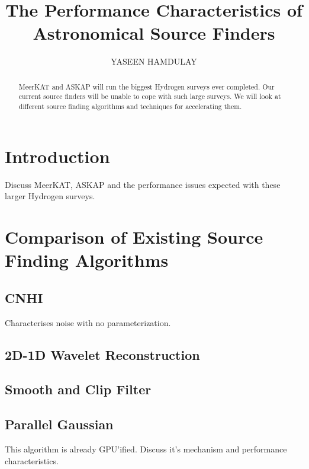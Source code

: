 \documentclass[prodmode,acmtecs]{acmsmall}
\begin{document}
\title{The Performance Characteristics of Astronomical Source Finders}
\author{YASEEN HAMDULAY
}

\begin{abstract}
MeerKAT and ASKAP will run the biggest Hydrogen surveys ever completed. Our current source
finders will be unable to cope with such large surveys. We will look at different source
finding algorithms and techniques for accelerating them.
\end{abstract}


\maketitle

\section{Introduction}
Discuss MeerKAT, ASKAP and the performance issues expected with these larger Hydrogen surveys.
\cite{holwerda2010trumpeting}
\cite{whiting2012source}
\cite{floer2014source}

\section{Comparison of Existing Source Finding Algorithms}
 \cite{westerlund2012assessing}
 \cite{popping2012comparison}

    \subsection{CNHI}
Characterises noise with no parameterization.
    \cite{jurek2012characterised}

    \subsection{2D-1D Wavelet Reconstruction}
    \cite{floer20122d}

    \subsection{Smooth and Clip Filter}
\cite{serra2012atlas3d}

    \subsection{Parallel Gaussian}
This algorithm is already GPU'ified. Discuss it's mechanism and performance characteristics.
        \cite{westerlund2014framework}
\end{document}
